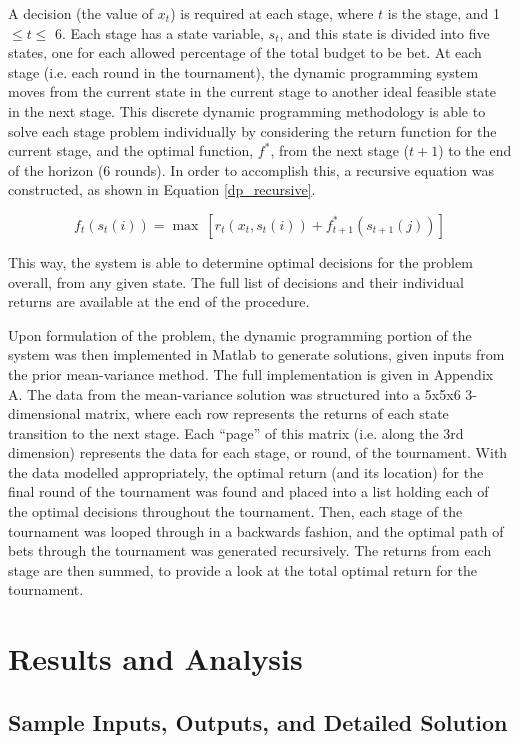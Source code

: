 \documentclass[12pt]{article}
\begin{document}
A decision (the value of $x_{t}$) is required at each stage, where $t$ is the stage, and 1 $\le t \le$ 6.
Each stage has a state variable, $s_{t}$, and this state is divided into five states, one for each allowed percentage of the total budget to be bet.
At each stage (i.e. each round in the tournament), the dynamic programming system moves from the current state in the current stage to another ideal feasible state in the next stage.
This discrete dynamic programming methodology is able to solve each stage problem individually by considering the return function for the current stage, and the optimal function, $f^{*}$, from the next stage ($t + 1$) to the end of the horizon (6 rounds).
In order to accomplish this, a recursive equation was constructed, as shown in Equation \ref{dp_recursive}.

\begin{equation}
f_{t}(s_{t}(i)) = \max \ [r_{t}(x_{t},s_{t}(i)) + f^{*}_{t+1}(s_{t+1}(j))]
\label{dp_recursive}
\end{equation}

This way, the system is able to determine optimal decisions for the problem overall, from any given state.
The full list of decisions and their individual returns are available at the end of the procedure.

Upon formulation of the problem, the dynamic programming portion of the system was then implemented in Matlab to generate solutions, given inputs from the prior mean-variance method.
The full implementation is given in Appendix A.
The data from the mean-variance solution was structured into a 5x5x6 3-dimensional matrix, where each row represents the returns of each state transition to the next stage.
Each ``page'' of this matrix (i.e. along the 3rd dimension) represents the data for each stage, or round, of the tournament.
With the data modelled appropriately, the optimal return (and its location) for the final round of the tournament was found and placed into a list holding each of the optimal decisions throughout the tournament.
Then, each stage of the tournament was looped through in a backwards fashion, and the optimal path of bets through the tournament was generated recursively.
The returns from each stage are then summed, to provide a look at the total optimal return for the tournament.

\section{Results and Analysis}
\subsection{Sample Inputs, Outputs, and Detailed Solution}
\end{document}
